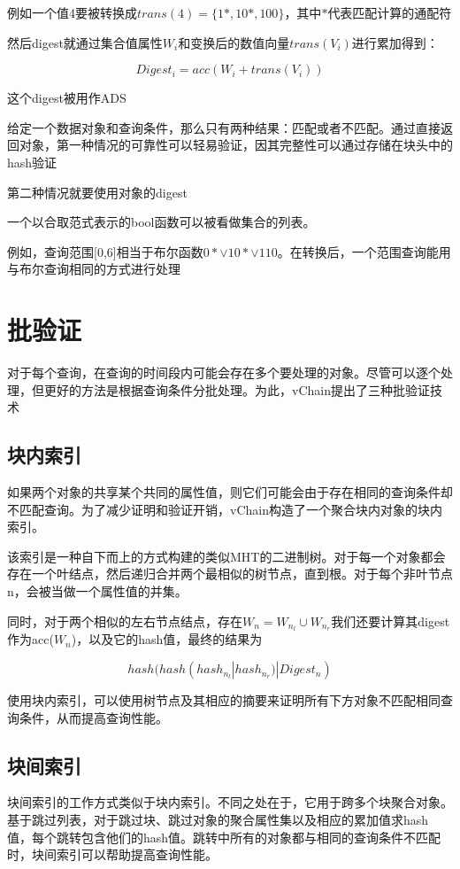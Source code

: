 \documentclass{article}
\begin{document}
例如一个值4要被转换成$trans(4)=\{1*,10*,100\}$，其中$*$代表匹配计算的通配符

然后digest就通过集合值属性$W_i$和变换后的数值向量$trans(V_i)$进行累加得到：

$$
Digest_i = acc(W_i+trans(V_i))
$$

这个digest被用作ADS

给定一个数据对象和查询条件，那么只有两种结果：匹配或者不匹配。通过直接返回对象，第一种情况的可靠性可以轻易验证，因其完整性可以通过存储在块头中的hash验证

第二种情况就要使用对象的digest

一个以合取范式表示的bool函数可以被看做集合的列表。

例如，查询范围[0,6]相当于布尔函数$0*\vee 10* \vee 110 $。在转换后，一个范围查询能用与布尔查询相同的方式进行处理

\section{批验证}

对于每个查询，在查询的时间段内可能会存在多个要处理的对象。尽管可以逐个处理，但更好的方法是根据查询条件分批处理。为此，vChain提出了三种批验证技术

\subsection{块内索引}

如果两个对象的共享某个共同的属性值，则它们可能会由于存在相同的查询条件却不匹配查询。为了减少证明和验证开销，vChain构造了一个聚合块内对象的块内索引。

该索引是一种自下而上的方式构建的类似MHT的二进制树。对于每一个对象都会存在一个叶结点，然后递归合并两个最相似的树节点，直到根。对于每个非叶节点n，会被当做一个属性值的并集。

同时，对于两个相似的左右节点结点，存在$W_n = W_{n_l}\cup W_{n_r}$我们还要计算其digest作为acc($W_n$)，以及它的hash值，最终的结果为

$$hash(hash(hash_{n_l}|hash_{n_r})|Digest_n)$$

使用块内索引，可以使用树节点及其相应的摘要来证明所有下方对象不匹配相同查询条件，从而提高查询性能。

\subsection{块间索引}

块间索引的工作方式类似于块内索引。不同之处在于，它用于跨多个块聚合对象。基于跳过列表，对于跳过块、跳过对象的聚合属性集以及相应的累加值求hash值，每个跳转包含他们的hash值。跳转中所有的对象都与相同的查询条件不匹配时，块间索引可以帮助提高查询性能。
\end{document}
